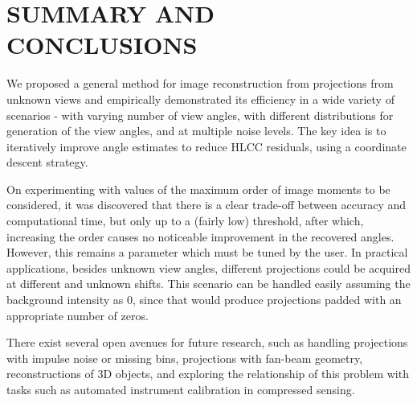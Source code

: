 \documentclass{article}
\begin{document}
\section{SUMMARY AND CONCLUSIONS}
\label{sec:conclusions}
We proposed a general method for image reconstruction from projections from unknown views and empirically demonstrated its efficiency in a wide variety of scenarios - with varying number of view angles, with different distributions for generation of the view angles, and at multiple noise levels. The key idea is to iteratively improve angle estimates to reduce HLCC residuals, using a coordinate descent strategy.

On experimenting with values of the maximum order of image moments to be considered, it was discovered that there is a clear trade-off between accuracy and computational time, but only up to a (fairly low) threshold, after which, increasing the order causes no noticeable improvement in the recovered angles. However, this remains a parameter which must be tuned by the user. In practical applications, besides unknown view angles, different projections could be acquired at different and unknown shifts. This scenario can be handled easily assuming the background intensity as 0, since that would produce projections padded with an appropriate number of zeros.   

There exist several open avenues for future research, such as handling projections with impulse noise or missing bins, projections with fan-beam geometry, reconstructions of 3D objects, and exploring the relationship of this problem with tasks such as automated instrument calibration in compressed sensing.


\vfill\pagebreak



\end{document}
